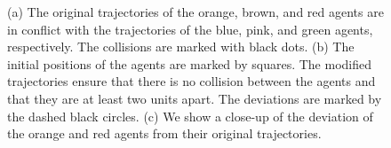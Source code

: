 \begin{figure}[h]
   \caption{%
    (a) The original trajectories of the orange, brown, and red agents are in conflict with the trajectories of the blue, pink, and green agents, respectively. The collisions are marked with black dots. (b) The initial positions of the agents are marked by squares. The modified trajectories ensure that there is no collision between the agents and that they are at least two units apart. The deviations are marked by the dashed black circles. (c) We show a close-up of the deviation of the orange and red agents from their original trajectories.
    }
    \label{fig:8agents}
\end{figure}
